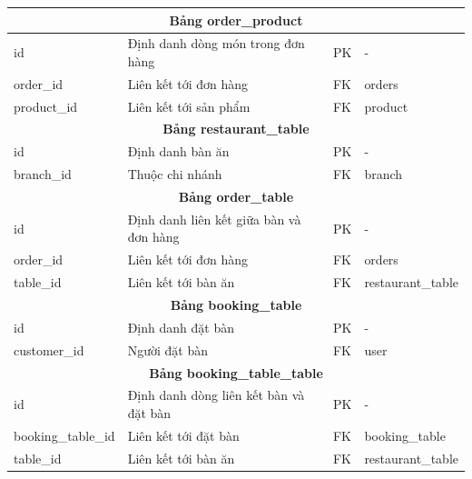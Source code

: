 \begin{longtable}{|l|p{6cm}|l|l|}
	\multicolumn{4}{|c|}{\textbf{Bảng order\_product}}                                                                      \\
	\hline
	id                      & Định danh dòng món trong đơn hàng              & PK                 & -                       \\
	order\_id               & Liên kết tới đơn hàng                          & FK                 & orders                  \\
	product\_id             & Liên kết tới sản phẩm                          & FK                 & product                 \\
	\hline

	\multicolumn{4}{|c|}{\textbf{Bảng restaurant\_table}}                                                                   \\
	\hline
	id                      & Định danh bàn ăn                               & PK                 & -                       \\
	branch\_id              & Thuộc chi nhánh                                & FK                 & branch                  \\
	\hline

	\multicolumn{4}{|c|}{\textbf{Bảng order\_table}}                                                                        \\
	\hline
	id                      & Định danh liên kết giữa bàn và đơn hàng        & PK                 & -                       \\
	order\_id               & Liên kết tới đơn hàng                          & FK                 & orders                  \\
	table\_id               & Liên kết tới bàn ăn                            & FK                 & restaurant\_table       \\
	\hline

	\multicolumn{4}{|c|}{\textbf{Bảng booking\_table}}                                                                      \\
	\hline
	id                      & Định danh đặt bàn                              & PK                 & -                       \\
	customer\_id            & Người đặt bàn                                  & FK                 & user                    \\
	\hline

	\multicolumn{4}{|c|}{\textbf{Bảng booking\_table\_table}}                                                               \\
	\hline
	id                      & Định danh dòng liên kết bàn và đặt bàn         & PK                 & -                       \\
	booking\_table\_id      & Liên kết tới đặt bàn                           & FK                 & booking\_table          \\
	table\_id               & Liên kết tới bàn ăn                            & FK                 & restaurant\_table       \\
	\hline


\end{longtable}
